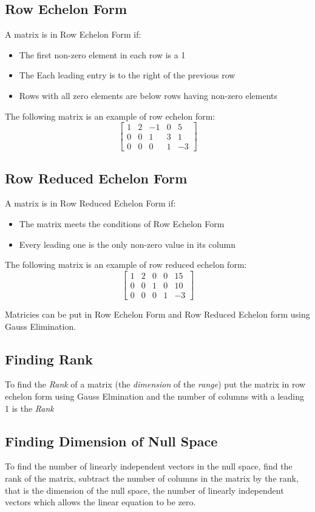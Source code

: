\documentclass[12pt]{article}
\begin{document}
\subsection*{Row Echelon Form}
A matrix is in Row Echelon Form if:
\begin{itemize}
	\item The first non-zero element in each row is a 1
	\item The Each leading entry is to the right of the previous row
	\item Rows with all zero elements are below rows having non-zero elements
\end{itemize}
\noindent
The following matrix is an example of row echelon form:
$$
\begin{bmatrix}
	1 & 2 & -1 & 0 & 5 \\
	0 & 0 & 1 & 3 & 1 \\
	0 & 0 & 0 & 1 & -3 
\end{bmatrix} 
$$

\subsection*{Row Reduced Echelon Form}
A matrix is in Row Reduced Echelon Form if:
\begin{itemize}
	\item The matrix meets the conditions of Row Echelon Form
	\item Every leading one is the only non-zero value in its column
\end{itemize}
\noindent
The following matrix is an example of row reduced echelon form:
$$
\begin{bmatrix}
	1 & 2 & 0 & 0 & 15 \\
	0 & 0 & 1 & 0 & 10 \\
	0 & 0 & 0 & 1 & -3 
\end{bmatrix} 
$$

\noindent
Matricies can be put in Row Echelon Form and Row Reduced Echelon form using Gauss Elimination.

\subsection*{Finding Rank}
To find the {\em Rank} of a matrix (the {\em dimension} of the {\em range}) put the matrix in row echelon form using Gauss Elmination and the number of columns with a leading 1 is the {\em Rank}

\subsection*{Finding Dimension of Null Space}
To find the number of linearly independent vectors in the null space, find the rank of the matrix, subtract the number of columns in the matrix by the rank, that is the dimension of the null space, the number of linearly independent vectors which allows the linear equation to be zero.
\end{document}
